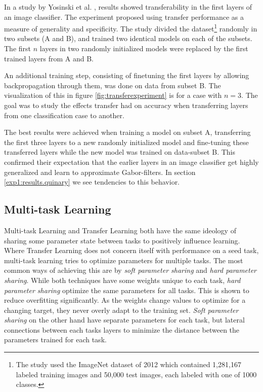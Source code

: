 In a study by Yosinski et al. \cite{yosinski2014transferable}, results showed transferability in the first layers of an image classifier. The experiment proposed using transfer performance as a measure of generality and specificity. The study divided the dataset\footnote{The study used the ImageNet dataset of 2012 which contained 1,281,167 labeled training images and 50,000 test images, each labeled with one of 1000 classes.} randomly in two subsets (A and B), and trained two identical models on each of the subsets. The first \(n\) layers in two randomly initialized models were replaced by the first trained layers from A and B. 

An additional training step, consisting of finetuning the first layers by allowing backpropagation through them, was done on data from subset B. The visualization of this in figure \ref{fig:transferexperiment} is for a case with \(n=3\). The goal was to study the effects transfer had on accuracy when transferring layers from one classification case to another. 

The best results were achieved when training a model on subset A, transferring the first three layers to a new randomly initialized model and fine-tuning these transferred layers while the new model was trained on data-subset B. This confirmed their expectation that the earlier layers in an image classifier get highly generalized and learn to approximate Gabor-filters. In section \ref{exp1:results.quinary} we see tendencies to this behavior. 

\subsection{Multi-task Learning}
Multi-task Learning and Transfer Learning both have the same ideology of sharing some parameter state between tasks to positively influence learning. Where Transfer Learning does not concern itself with performance on a seed task, multi-task learning tries to optimize parameters for multiple tasks. The most common ways of achieving this are by \textit{soft parameter sharing} and \textit{hard parameter sharing}. While both techniques have some weights unique to each task, \textit{hard parameter sharing} optimize the same parameters for all tasks. This is shown to reduce overfitting\cite{hardparametersharing} significantly. As the weights change values to optimize for a changing target, they never overly adapt to the training set. \textit{Soft parameter sharing} on the other hand have separate parameters for each task, but lateral connections between each tasks layers to minimize the distance between the parameters trained for each task.


